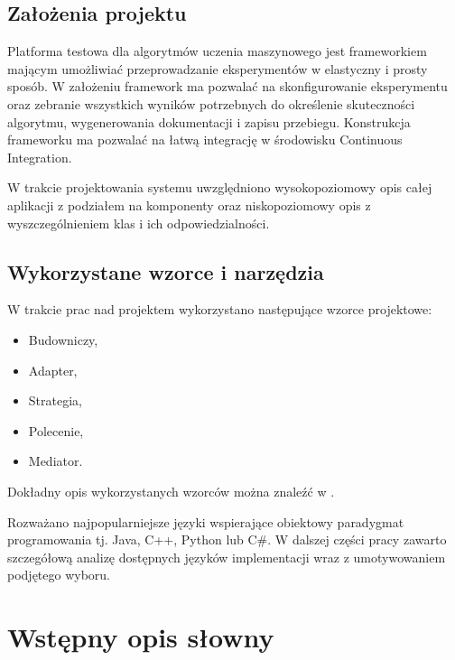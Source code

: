 \documentclass[12pt]{article}
\begin{document}
\subsection{Założenia projektu}

Platforma testowa dla algorytmów uczenia maszynowego jest frameworkiem mającym umożliwiać przeprowadzanie eksperymentów w elastyczny i prosty sposób. W założeniu framework ma pozwalać na skonfigurowanie eksperymentu oraz zebranie wszystkich wyników potrzebnych do określenie skuteczności algorytmu, wygenerowania dokumentacji i zapisu przebiegu. Konstrukcja frameworku ma pozwalać na łatwą integrację w środowisku Continuous Integration.

W trakcie projektowania systemu uwzględniono wysokopoziomowy opis całej aplikacji z podziałem na komponenty oraz niskopoziomowy opis z wyszczególnieniem klas i ich odpowiedzialności.

\subsection{Wykorzystane wzorce i narzędzia}

W trakcie prac nad projektem wykorzystano następujące wzorce projektowe:

\begin{itemize}
	\item Budowniczy,
	\item Adapter,
	\item Strategia,
	\item Polecenie,
	\item Mediator.
\end{itemize}

Dokładny opis wykorzystanych wzorców można znaleźć w \cite{gang-of-four}.

Rozważano najpopularniejsze języki wspierające obiektowy paradygmat programowania tj. Java, C++, Python lub C\#. W dalszej części pracy zawarto szczegółową analizę dostępnych języków implementacji wraz z umotywowaniem podjętego wyboru. 


\section{Wstępny opis słowny}
\end{document}
